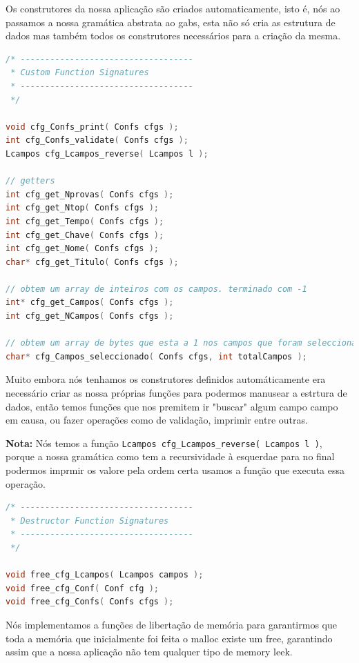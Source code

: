 \documentclass[11pt, a4paper, oneside]{article}
\begin{document}
Os construtores da nossa aplicação são criados automaticamente, isto é, nós ao passamos a nossa gramática abstrata ao gabs, esta não só cria as estrutura de dados mas também todos os construtores necessários para a criação da mesma.

\begin{lstlisting}[language=C, caption={Funções de Fihceiro de Configuração}]
/* -----------------------------------
 * Custom Function Signatures
 * -----------------------------------
 */

void cfg_Confs_print( Confs cfgs );
int cfg_Confs_validate( Confs cfgs );
Lcampos cfg_Lcampos_reverse( Lcampos l );

// getters
int cfg_get_Nprovas( Confs cfgs );
int cfg_get_Ntop( Confs cfgs );
int cfg_get_Tempo( Confs cfgs );
int cfg_get_Chave( Confs cfgs );
int cfg_get_Nome( Confs cfgs );
char* cfg_get_Titulo( Confs cfgs );

// obtem um array de inteiros com os campos. terminado com -1
int* cfg_get_Campos( Confs cfgs );
int cfg_get_NCampos( Confs cfgs );

// obtem um array de bytes que esta a 1 nos campos que foram seleccionados
char* cfg_Campos_seleccionado( Confs cfgs, int totalCampos );
\end{lstlisting} 

Muito embora nós tenhamos os construtores definidos automáticamente era necessário criar as nossa próprias funções para podermos manusear a estrtura de dados, então temos funções que nos premitem ir "buscar" algum campo campo em causa, ou fazer operações como de validação, imprimir entre outras.

\textbf{Nota:} Nós temos a função \texttt{Lcampos cfg\_Lcampos\_reverse( Lcampos l )}, porque a nossa gramática como tem a recursividade à esquerdae para no final podermos imprmir os valore pela ordem certa usamos a função que executa essa operação.


\begin{lstlisting}[language=C, caption={Funções de Libertação de Memória}]
/* -----------------------------------
 * Destructor Function Signatures
 * -----------------------------------
 */

void free_cfg_Lcampos( Lcampos campos );
void free_cfg_Conf( Conf cfg );
void free_cfg_Confs( Confs cfgs );
\end{lstlisting} 

Nós implementamos a funções de libertação de memória para garantirmos que toda a memória que inicialmente foi feita o malloc existe um free, garantindo assim que a nossa aplicação não tem qualquer tipo de memory leek.
\end{document}
